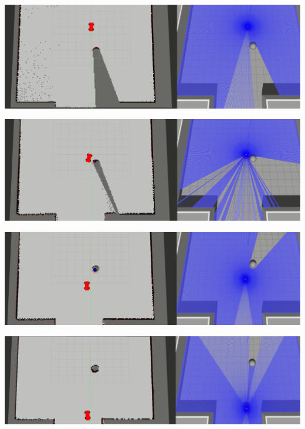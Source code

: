\begin{minipage}{\textwidth}
	\includegraphics[width=\textwidth]{figures/raw/local_planner_test_straight_traj_static_obj_1.png}

	\vspace{0.5cm}
	\includegraphics[width=\textwidth]{figures/raw/local_planner_test_straight_traj_static_obj_2.png}

	\vspace{0.5cm}
	\includegraphics[width=\textwidth]{figures/raw/local_planner_test_straight_traj_static_obj_3.png}

	\vspace{0.5cm}
	\includegraphics[width=\textwidth]{figures/raw/local_planner_test_straight_traj_static_obj_4.png}

	\label{local_planner_test_straight_traj_static_obj}
\end{minipage}

